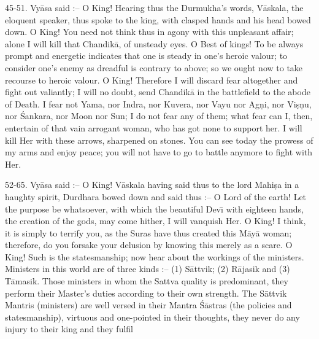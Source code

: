 45-51. Vy\=asa said :-- O King! Hearing thus the Durmukha's words, V\=askala, the eloquent speaker, thus spoke to the king, with clasped hands and his head bowed down. O King! You need not think thus in agony with this unpleasant affair; alone I will kill that Chandik\=a, of unsteady eyes. O Best of kings! To be always prompt and energetic indicates that one is steady in one's heroic valour; to consider one's enemy as dreadful is contrary to above; so we ought now to take recourse to heroic valour. O King! Therefore I will discard fear altogether and fight out valiantly; I will no doubt, send Chandik\=a in the battlefield to the abode of Death. I fear not Yama, nor Indra, nor Kuvera, nor Vayu nor Ag\d{n}i, nor Vi\d{s}\d{n}u, nor \'Sankara, nor Moon nor Sun; I do not fear any of them; what fear can I, then, entertain of that vain arrogant woman, who has got none to support her. I will kill Her with these arrows, sharpened on stones. You can see today the prowess of my arms and enjoy peace; you will not have to go to battle anymore to fight with Her.

52-65. Vy\=asa said :-- O King! V\=askala having said thus to the lord Mahi\d{s}a in a haughty spirit, Durdhara bowed down and said thus :-- O Lord of the earth! Let the purpose be whatsoever, with which the beautiful Dev\={\i} with eighteen hands, the creation of the gods, may come hither, I will vanquish Her. O King! I think, it is simply to terrify you, as the Suras have thus created this M\=ay\=a woman; therefore, do you forsake your delusion by knowing this merely as a scare. O King! Such is the statesmanship; now hear about the workings of the ministers. Ministers in this world are of three kinds :-- (1) S\=attvik; (2) R\=ajasik and (3) T\=amasik. Those ministers in whom the Sattva quality is predominant, they perform their Master's duties according to their own strength. The S\=attvik Mantris (ministers) are well versed in their Mantra \'S\=astras (the policies and statesmanship), virtuous and one-pointed in their thoughts, they never do any injury to their king and they fulfil

